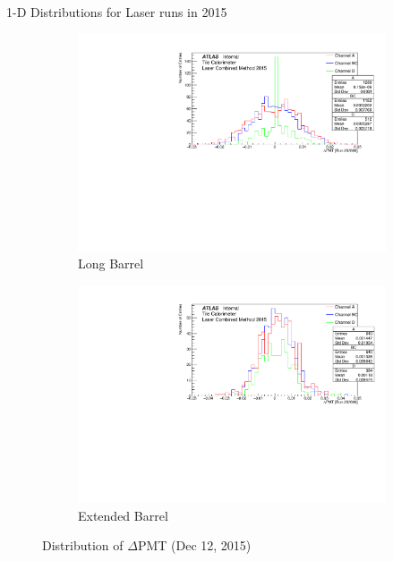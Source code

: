 \documentclass{beamer}
\begin{document}
\begin{frame}{1-D Distributions for Laser runs in 2015}
\begin{figure}[H]
\centering
\begin{subfigure} [t] {0.49\textwidth}
\includegraphics[width=\textwidth]{pmtLB3.pdf}
\caption{Long Barrel}
\end{subfigure}
\begin{subfigure} [t] {0.49\textwidth}
\includegraphics[width=\textwidth]{pmtEB3.pdf}
\caption{Extended Barrel}
\end{subfigure}
\caption{Distribution of $\Delta$PMT (Dec 12, 2015)}
\end{figure}
\end{frame}
\end{document}
